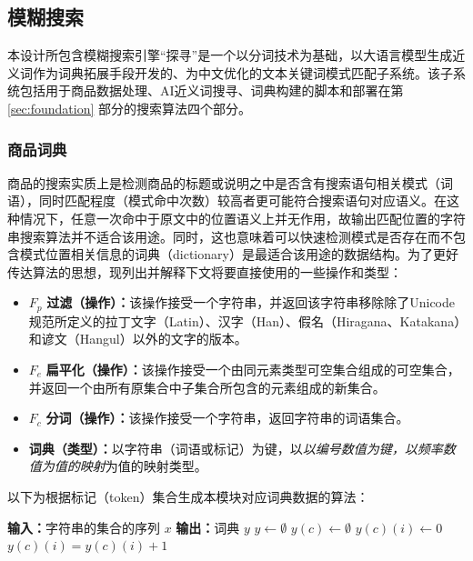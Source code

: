 \subsection{模糊搜索}

本设计所包含模糊搜索引擎“探寻”是一个以分词技术为基础，以大语言模型生成近义词作为词典拓展手段开发的、为中文优化的文本关键词模式匹配子系统。该子系统包括用于商品数据处理、AI近义词搜寻、词典构建的脚本和部署在第 \ref{sec:foundation} 部分的搜索算法四个部分。

\subsubsection{商品词典}

商品的搜索实质上是检测商品的标题或说明之中是否含有搜索语句相关模式（词语），同时匹配程度（模式命中次数）较高者更可能符合搜索语句对应语义。在这种情况下，任意一次命中于原文中的位置语义上并无作用，故输出匹配位置的字符串搜索算法并不适合该用途。同时，这也意味着可以快速检测模式是否存在而不包含模式位置相关信息的词典（dictionary）是最适合该用途的数据结构。为了更好传达算法的思想，现列出并解释下文将要直接使用的一些操作和类型：

\begin{itemize}
	\item $F_p$ \textbf{过滤（操作）：}该操作接受一个字符串，并返回该字符串移除除了Unicode规范\cite{unicode16.0}所定义的拉丁文字（Latin）、汉字（Han）、假名（Hiragana、Katakana）和谚文（Hangul）以外的文字的版本。
	\item $F_e$ \textbf{扁平化（操作）：}该操作接受一个由同元素类型可空集合组成的可空集合，并返回一个由所有原集合中子集合所包含的元素组成的新集合。
	\item $F_c$ \textbf{分词（操作）：}该操作接受一个字符串，返回字符串的词语集合。
	\item \textbf{词典（类型）：}以字符串（词语或标记）为键，以\textit{以编号数值为键，以频率数值为值的映射}为值的映射类型。
\end{itemize}

以下为根据标记（token）集合生成本模块对应词典数据的算法：

\vspace{1em}
\begin{algorithmic}
	\STATE \textbf{输入：}字符串的集合的序列 $x$
	\STATE \textbf{输出：}词典 $y$
	\STATE $y \gets \emptyset$
				\STATE $y(c) \gets \emptyset$
			\ENDIF
				\STATE $y(c)(i) \gets 0$
			\ENDIF
			\STATE $y(c)(i) = y(c)(i) + 1$
		\ENDFOR
	\ENDFOR
\end{algorithmic}
\vspace{1em}

